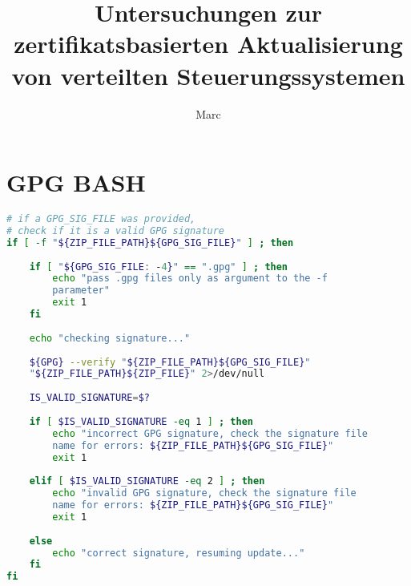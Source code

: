 \documentclass[thesis=bachelor,faculty=cb]{hsmw-thesis}
\title[Research on the certificate-based updating of embedded control systems]{Untersuchungen zur zertifikatsbasierten Aktualisierung von verteilten Steuerungssystemen}
\author{Marc}{Ulbricht}
\begin{document}
\chapter{GPG BASH}
\begin{lstlisting}[language=bash]
# if a GPG_SIG_FILE was provided, 
# check if it is a valid GPG signature
if [ -f "${ZIP_FILE_PATH}${GPG_SIG_FILE}" ] ; then
	
	if [ "${GPG_SIG_FILE: -4}" == ".gpg" ] ; then
	    echo "pass .gpg files only as argument to the -f 
	    parameter"
	    exit 1
	fi
	
	echo "checking signature..."
	
	${GPG} --verify "${ZIP_FILE_PATH}${GPG_SIG_FILE}"
	"${ZIP_FILE_PATH}${ZIP_FILE}" 2>/dev/null
	
	IS_VALID_SIGNATURE=$?
	
	if [ $IS_VALID_SIGNATURE -eq 1 ] ; then
	    echo "incorrect GPG signature, check the signature file 
	    name for errors: ${ZIP_FILE_PATH}${GPG_SIG_FILE}"
	    exit 1
	
	elif [ $IS_VALID_SIGNATURE -eq 2 ] ; then
	    echo "invalid GPG signature, check the signature file 
	    name for errors: ${ZIP_FILE_PATH}${GPG_SIG_FILE}"
	    exit 1
	
	else
	    echo "correct signature, resuming update..."
	fi
fi
	
\end{lstlisting}
\end{document}
